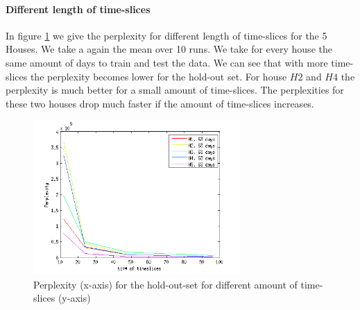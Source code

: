 \paragraph{Different length of time-slices}

In figure \ref{fig:PerplTS} we give the perplexity for different length of time-slices for the 5 Houses. We take a again the mean over 10 runs. We take for every house the same amount of days to train and test the data. We can see that with more time-slices the perplexity becomes lower for the hold-out set. For house $H2$ and $H4$ the perplexity is much better for a small amount of time-slices. The perplexities for these two houses drop much faster if the amount of time-slices increases.

\begin{figure}[h!]
 \centering
 \includegraphics[width = 0.7\textwidth]{Pictures/PerplTS.png}
 \caption{Perplexity (x-axis) for the hold-out-set for different amount of time-slices (y-axis)}
 \label{fig:PerplTS}
\end{figure}